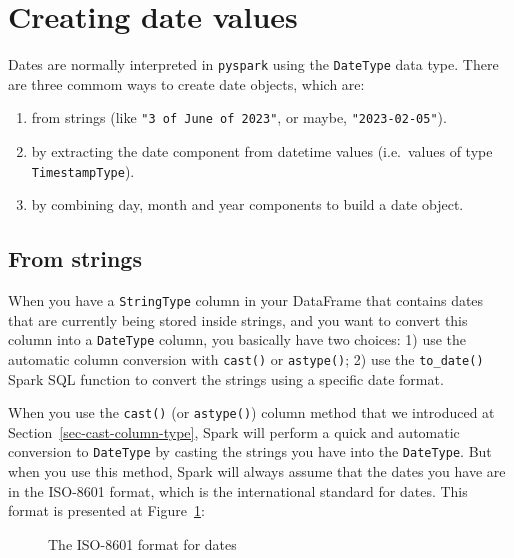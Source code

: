 \documentclass[
  11pt,
  letterpaper,
  DIV=11,
  numbers=noendperiod]{scrreprt}
\providecommand{\tightlist}{%
  \setlength{\itemsep}{0pt}\setlength{\parskip}{0pt}}\usepackage{longtable,booktabs,array}
\begin{document}
\section{Creating date values}\label{sec-create-dates}

Dates are normally interpreted in \texttt{pyspark} using the
\texttt{DateType} data type. There are three commom ways to create date
objects, which are:

\begin{enumerate}
\def\labelenumi{\arabic{enumi}.}
\tightlist
\item
  from strings (like \texttt{"3\ of\ June\ of\ 2023"}, or maybe,
  \texttt{"2023-02-05"}).
\item
  by extracting the date component from datetime values (i.e.~values of
  type \texttt{TimestampType}).
\item
  by combining day, month and year components to build a date object.
\end{enumerate}

\subsection{From strings}\label{from-strings}

When you have a \texttt{StringType} column in your DataFrame that
contains dates that are currently being stored inside strings, and you
want to convert this column into a \texttt{DateType} column, you
basically have two choices: 1) use the automatic column conversion with
\texttt{cast()} or \texttt{astype()}; 2) use the \texttt{to\_date()}
Spark SQL function to convert the strings using a specific date format.

When you use the \texttt{cast()} (or \texttt{astype()}) column method
that we introduced at Section~\ref{sec-cast-column-type}, Spark will
perform a quick and automatic conversion to \texttt{DateType} by casting
the strings you have into the \texttt{DateType}. But when you use this
method, Spark will always assume that the dates you have are in the
ISO-8601 format, which is the international standard for dates. This
format is presented at Figure~\ref{fig-iso-8601-dates}:

\begin{figure}


\caption{\label{fig-iso-8601-dates}The ISO-8601 format for dates}

\end{figure}%
\end{document}
